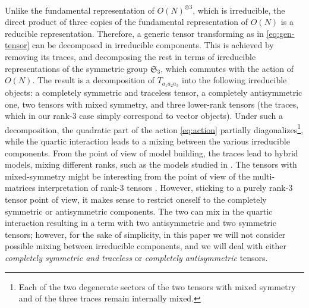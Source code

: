 \documentclass[10pt]{article}
\theoremstyle{plain}
\theoremstyle{definition}
\begin{document}
\

Unlike the fundamental representation of $O(N)^{\otimes 3}$, which is irreducible, the direct product of three copies of the fundamental representation of $O(N)$ is a reducible representation.
Therefore, a generic tensor transforming as in \eqref{eq:gen-tensor} can be decomposed in irreducible components. This is achieved by removing its traces, and decomposing the rest in terms of irreducible representations
of the symmetric group $ \mathfrak{S}_3$, which commutes with the action of $O(N)$. The result is a decomposition of $T_{a_1a_2 a_3}$ into the following irreducible objects: a completely symmetric and traceless tensor, 
a completely antisymmetric one, two tensors with mixed symmetry, and three lower-rank tensors (the traces, which in our rank-3 case simply correspond to vector objects). 
Under such a decomposition, the quadratic part of the action \eqref{eq:action} partially diagonalizes\footnote{Each of the two degenerate sectors of the two tensors with mixed symmetry and of the three traces remain internally mixed.}, while the quartic interaction leads to a mixing between the various irreducible components.
From the point of view of model building, the traces lead to hybrid models, mixing different ranks, such as the models studied in \cite{Halmagyi:2017leq}. The tensors with mixed-symmetry might be interesting 
from the point of view of the multi-matrices interpretation of rank-3 tensors \cite{Ferrari:2017ryl,Ferrari:2017jgw,Azeyanagi:2017drg,Azeyanagi:2017mre}. However, sticking to a purely rank-3 tensor point of view, it makes sense to restrict oneself 
to the completely symmetric or antisymmetric components. The two can mix in the quartic interaction resulting in a term with two antisymmetric and two symmetric tensors; however, for the sake of simplicity, in this
paper we will not consider possible mixing between irreducible components, and 
we will deal with either  \emph{completely symmetric and traceless} or  \emph{completely antisymmetric} 
tensors.
\end{document}
